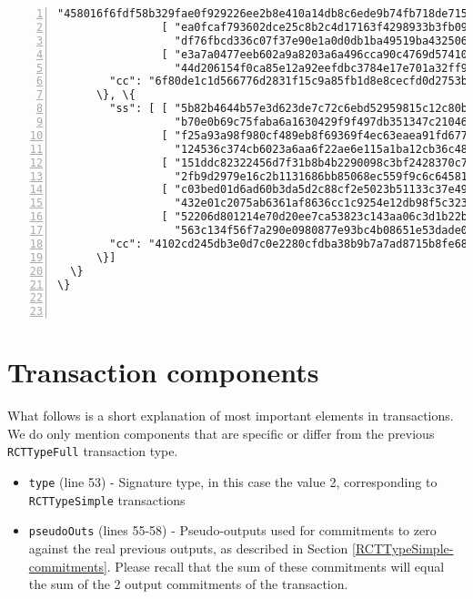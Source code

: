 \begin{appendices}
\begin{Verbatim}[commandchars=\\\{\}, numbers=left]
                  "458016f6fdf58b329fae0f929226ee2b8e410a14db8c6ede9b74fb718de71507"], 
                [ "ea0fcaf793602dce25c8b2c4d17163f4298933b3fb09874307d8cde9a63c2c0c", 
                  "df76fbcd336c07f37e90e1a0d0db1ba49519ba4325062228bc9242af2c525703"], 
                [ "e3a7a0477eeb602a9a8203a6a496cca90c4769d57410246c4c8d665df34df900", 
                  "44d206154f0ca85e12a92eefdbc3784e17e701a32ff93b550467679f67500c0d"]], 
        "cc": "6f80de1c1d566776d2831f15c9a85fb1d8e8cecfd0d2753b318f0e84d89d3b08"
      \}, \{
        "ss": [ [ "5b82b4644b57e3d623de7c72c6ebd52959815c12c80b479e4cbe5437cf67640c", 
                  "b70e0b69c75faba6a1630429f9f497db351347c210467f69e1b1c5f1a72afe02"], 
                [ "f25a93a98f980cf489eb8f69369f4ec63eaea91fd677decab9b6ca0fe2feb606", 
                  "124536c374cb6023a6aa6f22ae6e115a1ba12cb36c48f5f5ad43ce90f471da02"], 
                [ "151ddc82322456d7f31b8b4b2290098c3bf2428370c7ef325660b5463ff26404", 
                  "2fb9d2979e16c2b1131686bb85068ec559f9c6c64581e609b451bb2cd9d5740d"], 
                [ "c03bed01d6ad60b3da5d2c88cf2e5023b51133c37e4917511715a11f09d8740d", 
                  "432e01c2075ab6361af8636cc1c9254e12db98f5c323088792dfb42a1c894401"], 
                [ "52206d801214e70d20ee7ca53823c143aa06c3d1b22b118cc8a15c9f861f0102", 
                  "563c134f56f7a290e0980877e93bc4b08651e53dade079b1e6c066b70fb81406"]], 
        "cc": "4102cd245db3e0d7c0e2280cfdba38b9b7a7ad8715b8fe68c1170cf923b3d70d"
      \}]
  \}
\}



\end{Verbatim}

\section*{Transaction components}

What follows is a short explanation of most important elements in transactions.
We do only mention components that are specific or differ from the previous {\tt RCTTypeFull} transaction type.


\begin{itemize}
	\item {\tt type} (line 53) - Signature type, in this case the value 2, corresponding to {\tt RCTTypeSimple} transactions
    \item {\tt pseudoOuts} (lines 55-58) - Pseudo-outputs used for commitments to zero against the real previous outputs, 
       as described in Section \ref{RCTTypeSimple-commitments}. Please recall that the sum of these commitments will
       equal the sum of the 2 output commitments of the transaction. 
\end{itemize}

\end{appendices}